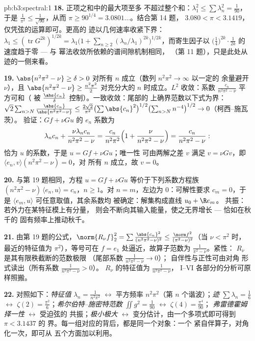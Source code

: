\begin{solution}{pb:b3:spectral:1}
\textbf{18.} 正项之和中的最大项至多
不超过整个和：$\lambda_1^2 \leq \sum\lambda_n^2 =
\frac1{90}$，于是 $\frac1{\pi^2} \leq \frac1{\sqrt{90}}$，从而
$\pi \geq 90^{1/4} = 3.0801\ldots$。结合第 14 题，
$3.080 < \pi < 3.1419$，仅凭弦的运算即可。更高的
迹以几何速率收紧下界：
$\lambda_1 \leq (\operatorname{tr}G^{2k})^{1/2k} =
\lambda_1\bigl(1 + \sum_{n\geq2}(\lambda_n/\lambda_1)^{2k}
\bigr)^{1/2k}$，而寄生因子以
$\bigl(\tfrac14\bigr)^{2k}\cdot\frac1{2k}$ 的速度趋于零 --- 与
幂法收敛所依赖的谱间隙机制相同，
（第 11 题），只是此处从迹的一侧来看。

\textbf{19.} $\abs{n^2\pi^2 - \nu} \geq \delta > 0$ 对所有
$n$ 成立（数列 $n^2\pi^2 \to \infty$ 以一定的
余量避开 $\nu$），且 $\abs{n^2\pi^2 - \nu} \geq \frac{n^2\pi^2}2$
对充分大的 $n$ 时成立。$L^2$ 收敛：系数
$\frac{c_n}{n^2\pi^2 - \nu}$ 平方可和（
被 $\frac{\abs{c_n}}\delta$ 控制）。一致收敛：尾部的
上确界范数以下式为界：$\sqrt2\sum_{n>N}
\frac{\abs{c_n}}{\abs{n^2\pi^2 - \nu}} \leq
\frac{2\sqrt2}{\pi^2}\bigl(\sum\abs{c_n}^2\bigr)^{1/2}
\bigl(\sum_{n>N}n^{-4}\bigr)^{1/2} \to 0$（柯西–施瓦茨）。
验证：$Gf + \nu Gu$ 的 $e_n$ 系数为
\[
\lambda_nc_n + \frac{\nu\lambda_nc_n}{n^2\pi^2 - \nu}
= \frac{c_n}{n^2\pi^2}\Bigl(1 + \frac{\nu}{n^2\pi^2 -
\nu}\Bigr) = \frac{c_n}{n^2\pi^2 - \nu} :
\]
恰为
$u$ 的系数，于是 $u = Gf + \nu Gu$；唯一性
可由两解之差 $v$ 满足 $v = \nu
Gv$，即 $\langle e_n, v\rangle(n^2\pi^2 - \nu) = 0$，对
所有 $n$ 成立，故 $v = 0$。

\textbf{20.} 与第 19 题相同，方程 $u = Gf + \nu
Gu$ 等价于下列系数方程族
$(n^2\pi^2 - \nu)\,\langle e_n, u\rangle = c_n$，$n \geq
1$。对 $n = m$，左边为
$0$：可解性要求 $c_m = 0$，于是 $\langle e_m,
u\rangle$ 可任意取值，其余系数均
被确定：解集构成直线 $u_0 + \R e_m$。
共振：若外力在某特征模上有分量，
则会不断向其输入能量，使之无界增长 --- 恰如在秋千的
固有频率上推动秋千。

\textbf{21.} 由第 19 题的公式，$\norm{R_\nu f}_2^2
= \sum\frac{\abs{c_n}^2}{(n^2\pi^2 - \nu)^2} \leq
\frac{\norm f^2}{(\pi^2 - \nu)^2}$（当 $\nu < \pi^2$ 时，
最近的特征值为 $\pi^2$），等号可在
$f = e_1$ 处逼近，故算子范数为 $\frac1{\pi^2 - \nu}$。紧性：
$R_\nu$ 是其有限秩截断的范数极限
（尾部系数 $\frac1{n^2\pi^2 - \nu} \to 0$）；
自伴性与正性可由对角
形式读出（所有系数 $\frac1{n^2\pi^2 - \nu} > 0$）。
$R_\nu$ 的特征值为 $\frac1{n^2\pi^2 - \nu}$，
I--VI 各部分的分析可原样照搬。

\textbf{22.} 对照如下：\emph{特征值} $\lambda_n =
\frac1{n^2\pi^2}$ $\leftrightarrow$ 平方频率
$n^2\pi^2$（第 $n$ 个谐波）；\emph{迹} $\sum
\lambda_n = \frac16$ $\leftrightarrow$ $\zeta(2) =
\frac{\pi^2}6$；\emph{希尔伯特–施密特范数} $\iint g^2 =
\frac1{90}$ $\leftrightarrow$ $\zeta(4) = \frac{\pi^4}{90}$；
\emph{弗雷德霍姆择一性} $\leftrightarrow$ 受迫弦的
共振；\emph{极小极大} $\leftrightarrow$
变分估计，由一个多项式即可得到 $\pi < 3.1437$ 的
界。每一组对应的背后，都是同一个对象：一个
紧自伴算子，对角化一次，即可从
五个方面加以利用。


\end{solution}

